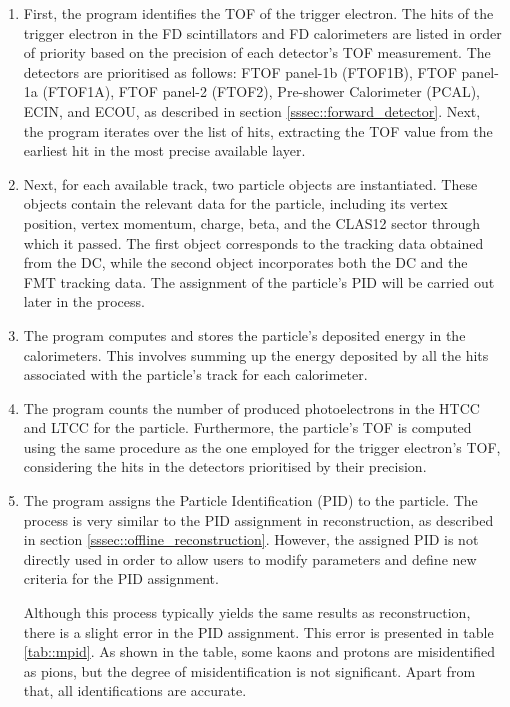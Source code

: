     \begin{enumerate}
        \item
            First, the program identifies the TOF of the trigger electron.
            The hits of the trigger electron in the FD scintillators and FD calorimeters are listed in order of priority based on the precision of each detector's TOF measurement.
            The detectors are prioritised as follows: FTOF panel-1b (FTOF1B), FTOF panel-1a (FTOF1A), FTOF panel-2 (FTOF2), Pre-shower Calorimeter (PCAL), ECIN, and ECOU, as described in section \ref{sssec::forward_detector}.
            Next, the program iterates over the list of hits, extracting the TOF value from the earliest hit in the most precise available layer.

        \item
            Next, for each available track, two particle objects are instantiated.
            These objects contain the relevant data for the particle, including its vertex position, vertex momentum, charge, beta, and the CLAS12 sector through which it passed.
            The first object corresponds to the tracking data obtained from the DC, while the second object incorporates both the DC and the FMT tracking data.
            The assignment of the particle's PID will be carried out later in the process.

        \item
            The program computes and stores the particle's deposited energy in the calorimeters.
            This involves summing up the energy deposited by all the hits associated with the particle's track for each calorimeter.

        \item
            The program counts the number of produced photoelectrons in the HTCC and LTCC for the particle.
            Furthermore, the particle's TOF is computed using the same procedure as the one employed for the trigger electron's TOF, considering the hits in the detectors prioritised by their precision.

        \item
            The program assigns the Particle Identification (PID) to the particle.
            The process is very similar to the PID assignment in reconstruction, as described in section \ref{sssec::offline_reconstruction}.
            However, the assigned PID is not directly used in order to allow users to modify parameters and define new criteria for the PID assignment.

            Although this process typically yields the same results as reconstruction, there is a slight error in the PID assignment.
            This error is presented in table \ref{tab::mpid}.
            As shown in the table, some kaons and protons are misidentified as pions, but the degree of misidentification is not significant.
            Apart from that, all identifications are accurate.


\end{enumerate}
